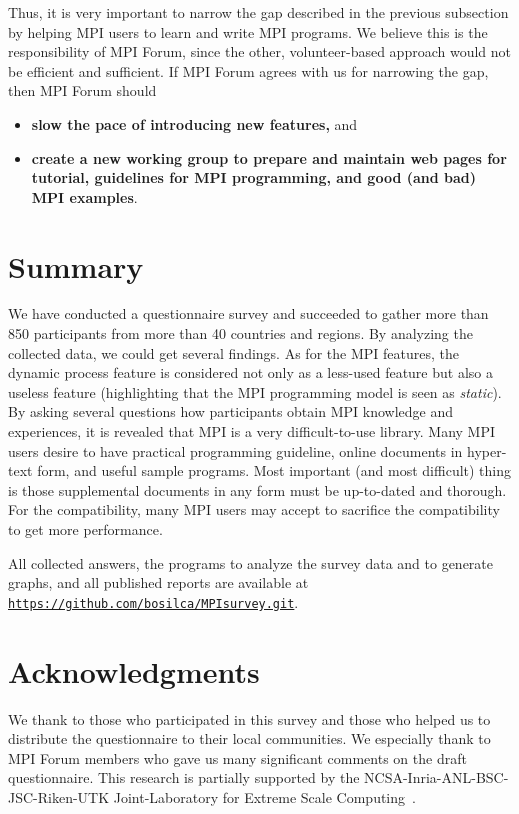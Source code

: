 \documentclass[preprint,5p,times]{elsarticle}
\begin{document}
Thus, it is very important to narrow the gap described in the previous
subsection by helping MPI users to learn and write MPI programs. We
believe this is the responsibility of MPI Forum, since the other,
volunteer-based approach would not be efficient and sufficient. If
MPI Forum agrees with us for narrowing the gap, then MPI Forum should

\begin{itemize}
\item {\bf slow the pace of introducing new features,} and
\item {\bf create a new working group to prepare and maintain web pages for
  tutorial, guidelines for MPI programming, and good (and bad) MPI
  examples}.
\end{itemize}

\section{Summary}

We have conducted a questionnaire survey and succeeded to gather more
than 850 participants from more than 40 countries and regions. By
analyzing the collected data, we could get several findings. As for
the MPI features, the dynamic process feature is considered not only
as a less-used feature but also a useless feature (highlighting that
the MPI programming model is seen as {\em static}). By asking several
questions how participants obtain MPI knowledge and experiences, it is
revealed that MPI is a very difficult-to-use library.
Many MPI users desire to have
practical programming guideline, online documents in
hyper-text form, and useful sample programs. Most important
(and most difficult) thing is those supplemental
documents in any form must be up-to-dated and thorough. For the
compatibility, many MPI users may accept to sacrifice the
compatibility to get more performance.

All collected answers, the programs to analyze the survey data and to
generate graphs, and all published reports are available at
{\tt \url{https://github.com/bosilca/MPIsurvey.git}}.

\section*{Acknowledgments}

We thank to those who participated in this survey and those who
helped us to distribute the questionnaire to their local
communities. We especially thank to MPI Forum members who gave us many
significant comments on the draft questionnaire.
This research is partially supported by the
NCSA-Inria-ANL-BSC-JSC-Riken-UTK Joint-Laboratory for Extreme Scale
Computing~\cite{JLESC}.
\end{document}
